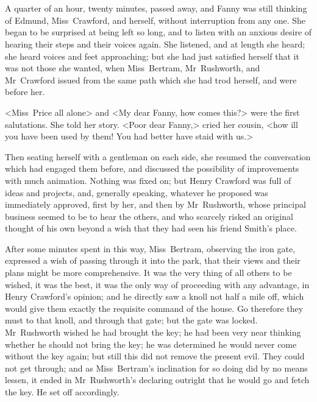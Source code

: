 \chapter[Chapter \thechapter]{} 
	
\lettrine[lraise=0.3]{A}{} quarter of an hour, twenty minutes, passed away, and Fanny was still thinking of Edmund, Miss~Crawford, and herself, without interruption from any one. She began to be surprised at being left so long, and to listen with an anxious desire of hearing their steps and their voices again. She listened, and at length she heard; she heard voices and feet approaching; but she had just satisfied herself that it was not those she wanted, when Miss~Bertram, Mr~Rushworth, and Mr~Crawford issued from the same path which she had trod herself, and were before her.

<Miss~Price all alone> and <My dear Fanny, how comes this?> were the first salutations. She told her story. <Poor dear Fanny,> cried her cousin, <how ill you have been used by them! You had better have staid with us.>

Then seating herself with a gentleman on each side, she resumed the conversation which had engaged them before, and discussed the possibility of improvements with much animation. Nothing was fixed on; but Henry Crawford was full of ideas and projects, and, generally speaking, whatever he proposed was immediately approved, first by her, and then by Mr~Rushworth, whose principal business seemed to be to hear the others, and who scarcely risked an original thought of his own beyond a wish that they had seen his friend Smith's place.

After some minutes spent in this way, Miss~Bertram, observing the iron gate, expressed a wish of passing through it into the park, that their views and their plans might be more comprehensive. It was the very thing of all others to be wished, it was the best, it was the only way of proceeding with any advantage, in Henry Crawford's opinion; and he directly saw a knoll not half a mile off, which would give them exactly the requisite command of the house. Go therefore they must to that knoll, and through that gate; but the gate was locked. Mr~Rushworth wished he had brought the key; he had been very near thinking whether he should not bring the key; he was determined he would never come without the key again; but still this did not remove the present evil. They could not get through; and as Miss~Bertram's inclination for so doing did by no means lessen, it ended in Mr~Rushworth's declaring outright that he would go and fetch the key. He set off accordingly.

